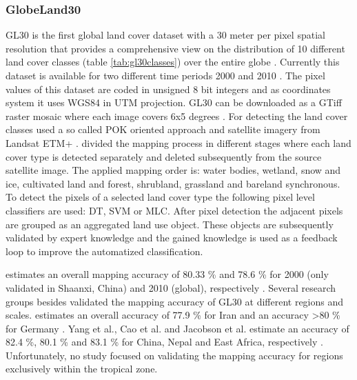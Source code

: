 		\subsubsection{GlobeLand30}
			\ac{GL30} is the first global land cover dataset with a 30 meter per pixel spatial resolution that provides a comprehensive view on the distribution of 10 different land cover classes (table \ref{tab:gl30classes}) over the entire globe \citep{Chen2017}. Currently this dataset is available for two different time periods 2000 and 2010 \citep{Chen2015}. The pixel values of this dataset are coded in unsigned 8 bit integers and as coordinates system it uses \ac{WGS84} in \ac{UTM} projection. \ac{GL30} can be downloaded as a \ac{GTiff} raster mosaic where each image covers 6x5 degrees \citep{Chen2014}. For detecting the land cover classes \citeauthor{Chen2015} used a so called \ac{POK} oriented approach and satellite imagery from Landsat \ac{ETM+} \citep{Chen2015}. \citeauthor{Chen2015} divided the mapping process in different stages where each land cover type is detected separately and deleted subsequently from the source satellite image. The applied mapping order is: water bodies, wetland, snow and ice, cultivated land and forest, shrubland, grassland and bareland synchronous. To detect the pixels of a selected land cover type the following pixel level classifiers are used: \ac{DT}, \ac{SVM} or \ac{MLC}. After pixel detection the adjacent pixels are grouped as an aggregated land use object. These objects are subsequently validated by expert knowledge and the gained knowledge is used as a feedback loop to improve the automatized classification.

			\citeauthor{Chen2015} estimates an overall mapping accuracy of 80.33 \% and 78.6 \% for 2000 (only validated in Shaanxi, China) and 2010 (global), respectively \citep{Chen2015}. Several research groups besides \citeauthor{Chen2015} validated the mapping accuracy of \ac{GL30} at different regions and scales. \citeauthor{Arsanjani2016} estimates an overall accuracy of 77.9 \% for Iran and an accuracy >80 \% for Germany \citep{Arsanjani2016a,Arsanjani2016}. Yang et al., Cao et al. and Jacobson et al. estimate an accuracy of 82.4 \%, 80.1 \% and 83.1 \% for China, Nepal and East Africa, respectively \citep{Yang2017,Cao2016,Jacobson2015}. Unfortunately, no study focused on validating the mapping accuracy for regions exclusively within the tropical zone.

